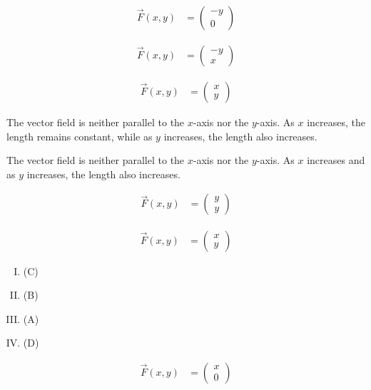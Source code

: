 \documentclass[8pt]{extarticle}
\begin{document}
  \begin{problem}{17.3}
    \begin{description}[font=\normalfont]
      \item[2:]
        \begin{align*}
          \vec{F}(x,y) &= \begin{pmatrix}-y\\0\end{pmatrix}
        \end{align*}
      \item[4:]
        \begin{align*}
          \vec{F}(x,y) &= \begin{pmatrix}-y\\x\end{pmatrix}
        \end{align*}
      \item[6:]
        \begin{align*}
          \vec{F}(x,y) &= \begin{pmatrix}x\\y\end{pmatrix}
        \end{align*}
      \item[8:] The vector field is neither parallel to the $x$-axis nor the $y$-axis. As $x$ increases, the length remains constant, while as $y$ increases, the length also increases.
      \item[10:] The vector field is neither parallel to the $x$-axis nor the $y$-axis. As $x$ increases and as $y$ increases, the length also increases.
      \item[24:]
        \begin{align*}
          \vec{F}(x,y) &= \begin{pmatrix}y\\y\end{pmatrix}
        \end{align*}
      \item[26:]
        \begin{align*}
          \vec{F}(x,y) &= \begin{pmatrix}x\\y\end{pmatrix}
        \end{align*}
      \item[28:]
        \begin{enumerate}[(I)]
          \item (C)
          \item (B)
          \item (A)
          \item (D)
        \end{enumerate}
      \item[32:]
        \begin{align*}
          \vec{F}(x,y) &= \begin{pmatrix}x\\0\end{pmatrix}
        \end{align*}
    \end{description}
  \end{problem}
\end{document}

